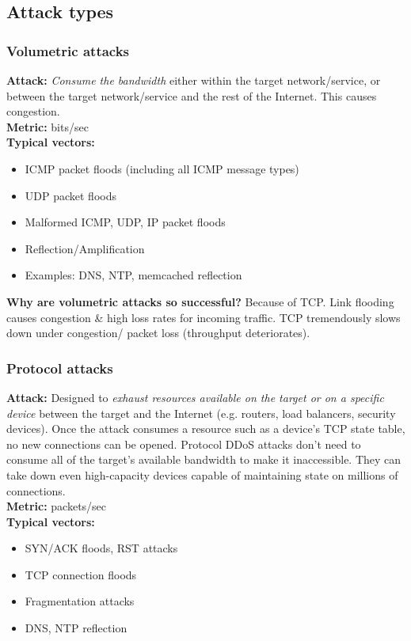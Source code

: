 \documentclass[11pt,oneside,a4paper]{article}
\begin{document}
\subsection{Attack types}

\subsubsection{Volumetric attacks}

\noindent \textbf{Attack:} \textit{Consume the bandwidth} either within the target network/service, or between the target network/service and the rest of the Internet. This causes congestion.\\
\noindent \textbf{Metric:} bits/sec\\
\noindent \textbf{Typical vectors:}
\vspace{-\topsep}
\begin{itemize}
	\setlength{\itemsep}{0pt}
	\setlength{\parskip}{0pt}
	\item ICMP packet floods (including all ICMP message types)
	\item UDP packet floods
	\item Malformed ICMP, UDP, IP packet floods
	\item Reflection/Amplification
	\item Examples: DNS, NTP, memcached reflection
\end{itemize}
\vspace{-\topsep}

\noindent \textbf{Why are volumetric attacks so successful?} Because of TCP. Link flooding causes congestion \& high loss rates for incoming traffic. TCP tremendously slows down under congestion/ packet loss (throughput deteriorates).

\subsubsection{Protocol attacks}

\noindent \textbf{Attack:} Designed to \textit{exhaust resources available on the target or on a specific device} between the target and the Internet (e.g. routers, load balancers, security devices). Once the attack consumes a resource such as a device’s TCP state table, no new connections can be opened. Protocol DDoS attacks don't need to consume all of the target’s available bandwidth to make it inaccessible. They can take down even high-capacity devices capable of maintaining state on millions of connections.\\
\noindent \textbf{Metric:} packets/sec\\
\noindent \textbf{Typical vectors:}
\vspace{-\topsep}
\begin{itemize}
	\setlength{\itemsep}{0pt}
	\setlength{\parskip}{0pt}
	\item SYN/ACK floods, RST attacks
	\item TCP connection floods
	\item Fragmentation attacks
	\item DNS, NTP reflection
\end{itemize}
\vspace{-\topsep}
\end{document}
